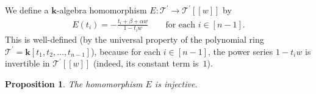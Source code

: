 \documentclass[pdftex]{sigma}
\newtheorem{Proposition}[Theorem]{Proposition}
\numberwithin{equation}{section}
\begin{document}
\begin{Definition} We define a $\mathbf{k}$-algebra homomorphism $E\colon \mathcal{T}^{\prime}\rightarrow\mathcal{T}^{\prime}[[w]] $ by
\begin{gather*}
E(t_{i}) =-\frac{t_{i}+\beta+\alpha w}{1-t_{i}w} \qquad \text{for each }i\in[n-1] .
\end{gather*}
This is well-defined (by the universal property of the polynomial ring $\mathcal{T}^{\prime}=\mathbf{k}[ t_{1},t_{2},\ldots,t_{n-1}] $), because for each $i\in[n-1] $, the power series $1-t_{i}w$ is invertible in $\mathcal{T}^{\prime}[[w]] $ (indeed, its constant term is~$1$).
\end{Definition}

\begin{Proposition}\label{prop.E.inj}The homomorphism $E$ is injective.
\end{Proposition}
\end{document}
